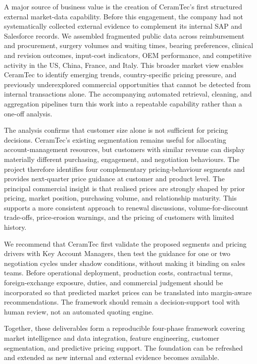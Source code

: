 \documentclass{article}
\begin{document}
A major source of business value is the creation of CeramTec's first structured external market-data capability. Before this engagement, the company had not systematically collected external evidence to complement its internal SAP and Salesforce records. We assembled fragmented public data across reimbursement and procurement, surgery volumes and waiting times, bearing preferences, clinical and revision outcomes, input-cost indicators, OEM performance, and competitive activity in the US, China, France, and Italy. This broader market view enables CeramTec to identify emerging trends, country-specific pricing pressure, and previously underexplored commercial opportunities that cannot be detected from internal transactions alone. The accompanying automated retrieval, cleaning, and aggregation pipelines turn this work into a repeatable capability rather than a one-off analysis.

The analysis confirms that customer size alone is not sufficient for pricing decisions. CeramTec's existing segmentation remains useful for allocating account-management resources, but customers with similar revenue can display materially different purchasing, engagement, and negotiation behaviours. The project therefore identifies four complementary pricing-behaviour segments and provides next-quarter price guidance at customer and product level. The principal commercial insight is that realised prices are strongly shaped by prior pricing, market position, purchasing volume, and relationship maturity. This supports a more consistent approach to renewal discussions, volume-for-discount trade-offs, price-erosion warnings, and the pricing of customers with limited history.

We recommend that CeramTec first validate the proposed segments and pricing drivers with Key Account Managers, then test the guidance for one or two negotiation cycles under shadow conditions, without making it binding on sales teams. Before operational deployment, production costs, contractual terms, foreign-exchange exposure, duties, and commercial judgement should be incorporated so that predicted market prices can be translated into margin-aware recommendations. The framework should remain a decision-support tool with human review, not an automated quoting engine.

Together, these deliverables form a reproducible four-phase framework covering market intelligence and data integration, feature engineering, customer segmentation, and predictive pricing support. The foundation can be refreshed and extended as new internal and external evidence becomes available.
\end{document}
